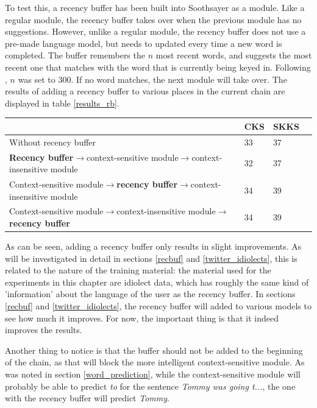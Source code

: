 \documentclass[12pt]{article}
\let\originaltable\table
\let\endoriginaltable\endtable
\renewenvironment{table}[1][ht]{%
  \originaltable[#1]
  \centering}%
  {\endoriginaltable}
\begin{document}
To test this, a recency buffer has been built into Soothsayer as a module. Like a regular module, the recency buffer takes over when the previous module has no suggestions. However, unlike a regular module, the recency buffer does not use a pre-made language model, but needs to updated every time a new word is completed. The buffer remembers the $n$ most recent words, and suggests the most recent one that matches with the word that is currently being keyed in. Following , $n$ was set to 300. If no word matches, the next module will take over. The results of adding a recency buffer to various places in the current chain are displayed in table \ref{results_rb}.

\begin{table}[h]
\begin{tabular}{l|lll} 

&CKS&SKKS\\
\hline
Without recency buffer&33&37\\
\textbf{Recency buffer}$\rightarrow$context-sensitive module$\rightarrow$context-insensitive module&32&37\\
Context-sensitive module$\rightarrow$\textbf{recency buffer}$\rightarrow$context-insensitive module&34&39\\
Context-sensitive module$\rightarrow$context-insensitive module$\rightarrow$\textbf{recency buffer}&34&39\\
\end{tabular} 
\caption{Percentage of keystrokes saved with and without a recency buffer.} \label{results_rb}
\end{table}

As can be seen, adding a recency buffer only results in slight improvements. As will be investigated in detail in sections \ref{recbuf} and \ref{twitter_idiolects}, this is related to the nature of the training material: the material used for the experiments in this chapter are idiolect data, which has roughly the same kind of 'information' about the language of the user as the recency buffer. In sections \ref{recbuf} and \ref{twitter_idiolects}, the recency buffer will added to various models to see how much it improves. For now, the important thing is that it indeed improves the results. 

Another thing to notice is that the buffer should not be added to the beginning of the chain, as that will block the more intelligent context-sensitive module. As was noted in section \ref{word_prediction}, while the context-sensitive module will probably be able to predict \emph{to} for the sentence \emph{Tommy was going t...}, the one with the recency buffer will predict \emph{Tommy}.
\end{document}
